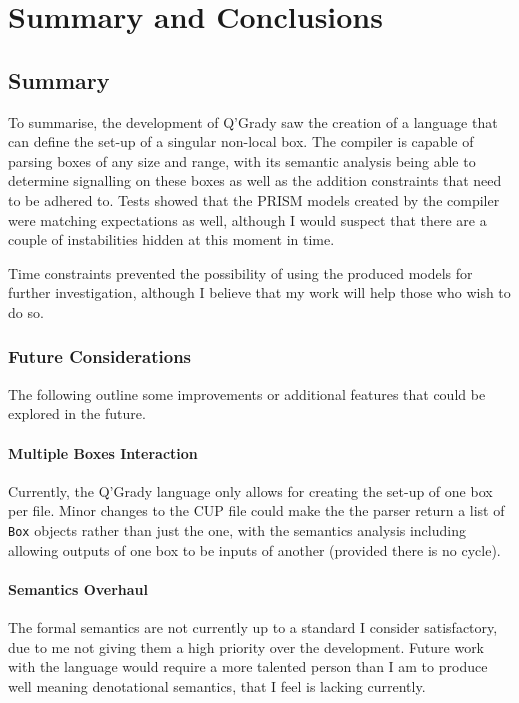 \documentclass[report.tex]{subfiles}
\begin{document}
\chapter{Summary and Conclusions} %
\label{cha:summary_and_conclusions}
\section{Summary} %
\label{sec:summary}
To summarise, the development of Q'Grady saw the creation of a language that can
define the set-up of a singular non-local box. The compiler is capable of
parsing boxes of any size and range, with its semantic analysis being able to
determine signalling on these boxes as well as the addition constraints that
need to be adhered to. Tests showed that the PRISM models created by the
compiler were matching expectations as well, although I would suspect that there
are a couple of instabilities hidden at this moment in time.

Time constraints prevented the possibility of using the produced models for
further investigation, although I believe that my work will help those who wish
to do so.

\subsection{Future Considerations} %
\label{sub:future_considerations}
The following outline some improvements or additional features that could
be explored in the future.

\subsubsection{Multiple Boxes Interaction} %
\label{ssub:multiple_boxes_interaction}
Currently, the Q'Grady language only allows for creating the set-up of one box
per file. Minor changes to the CUP file could make the the parser return a list
of \texttt{Box} objects rather than just the one, with the semantics analysis
including allowing outputs of one box to be inputs of another (provided there is
no cycle).

\subsubsection{Semantics Overhaul} %
\label{ssub:semantics_overhaul}
The formal semantics are not currently up to a standard I consider satisfactory,
due to me not giving them a high priority over the development. Future work with
the language would require a more talented person than I am to produce well
meaning denotational semantics, that I feel is lacking currently.
\end{document}
